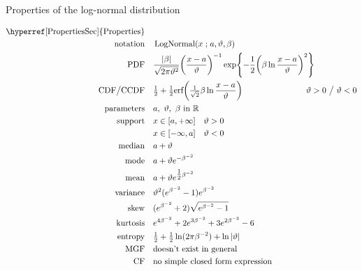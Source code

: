 

\begin{table*}[t!]
\caption[Log-normal distribution -- Properties]{Properties of the log-normal distribution}
 \begin{align*}
\text{\hyperref[PropertiesSec]{Properties}}  \quad& \\
\text{notation} \quad & \op{LogNormal}(x\given a, \vartheta,\beta ) \checked  	
\\
\text{PDF}\quad &   \frac{|\beta|}{\sqrt{2\pi \vartheta^2}} \Left(\frac{x-a}{\vartheta}\Right)^{-1} \exp\Left\{-\frac{1}{2} \Left( \beta \ln \frac{x-a}{\vartheta} \Right)^2 \Right\}	\checked					
\\
\text{CDF} \big/ \text{CCDF} \quad  &   \tfrac{1}{2} +  \tfrac{1}{2}\text{erf}\Left( \sfrac{1}{\sqrt{2}} \beta \ln \frac{x-a}{\vartheta} \Right) \checked
& \hspace{-2em} \vartheta >0 \ \big/ \ \vartheta <0
\\
\text{parameters}\quad &   a,\  \vartheta,\ \beta \text{ in } \Real		 \checked
\\
\text{support} \quad &   x \in [a, +\infty] \quad \vartheta>0 \checked
\\
& x \in [-\infty,a] \quad \vartheta<0 \checked
\\
\text{median} \quad  &  a+ \vartheta \checked
\\
\text{mode} \quad  & a+ \vartheta e^{-\beta^{-2}} \checked
\\
\text{mean} \quad  &  a + \vartheta e^{\tfrac{1}{2} \beta^{-2}} \checked
\\
\text{variance} \quad  & \vartheta^2 (e^{\beta^{-2}} -1) e^{\beta^{-2}} \checked
\\
\text{skew} \quad  &  ( e^{\beta^{-2}} +2) \sqrt{e^{\beta^{-2}} -1} \checked
\\
\text{kurtosis} \quad  &  e^{4\beta^{-2}} +2e^{3\beta^{-2}} +3e^{2\beta^{-2}} -6 \checked
\\
\text{entropy} \quad  & \tfrac{1}{2} + \tfrac{1}{2} \ln(2\pi\beta^{-2}) + \ln | \vartheta | \checked
\\
\text{MGF} \quad  &  \text{doesn't exist in general} \checked
\\
\text{CF} \quad  &  \text{no simple closed form expression} \checked
\end{align*}
\end{table*}
